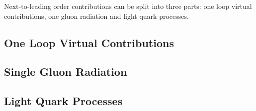 Next-to-leading order contributions can be split into three parts: one loop virtual contributions, one gluon radiation and light quark processes.

\subsection{One Loop Virtual Contributions}


\subsection{Single Gluon Radiation}


\subsection{Light Quark Processes}

